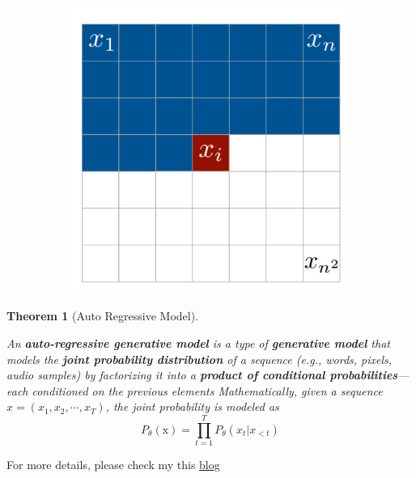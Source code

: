 \documentclass[
  12pt,
]{article}
\theoremstyle{plain}
\newtheorem{theorem}{Theorem}[section]
\theoremstyle{remark}
\begin{document}
\begin{figure}
\begin{minipage}{0.50\linewidth}
\begin{figure}[H]
{\centering \includegraphics[width=5in,height=\textheight,keepaspectratio]{Generative Model Overview_files/mediabag/2017-02-22-183010_47.png}

}


\end{figure}%

\end{minipage}%

\end{figure}%

\begin{theorem}[Auto Regressive
Model]\protect\hypertarget{thm-ar}{}\label{thm-ar}

An \textbf{auto-regressive generative model} is a type of
\textbf{generative model} that models the \textbf{joint probability
distribution} of a sequence (e.g., words, pixels, audio samples) by
factorizing it into a \textbf{product of conditional
probabilities}---each conditioned on the previous elements
Mathematically, given a sequence \(x = (x_1, x_2, \cdots, x_T)\), the
joint probability is modeled as \[
P_\theta(\mathrm{x}) = \prod_{t=1}^T P_\theta(x_t | x_{<t})
\]

\end{theorem}

For more details, please check my this \href{}{blog}
\end{document}
